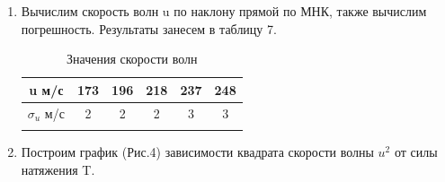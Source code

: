 \documentclass[a4paper, 12pt]{article}%
\begin{document}
\begin{enumerate}
  \begin{figure}[H]
\caption{}
\end{figure}

\newpage
\item Вычислим скорость волн u по наклону прямой по МНК, также вычислим погрешность. Результаты занесем в таблицу 7.
  
  \begin{longtable}{|c|c|c|c|c|c|}
  	\hline 
  	u м/с & 173& 196& 218& 237& 248\\
  	\hline
  	$\sigma_u$ м/с &2 &2&2&3&3\\
  	\hline
  	\caption{Значения скорости волн}
  \end{longtable}

\item Построим график (Рис.4) зависимости квадрата скорости волны $u^2$ от силы натяжения T.
\begin{figure}[H]
	\caption{}
\end{figure}


\end{enumerate}
\end{document}
